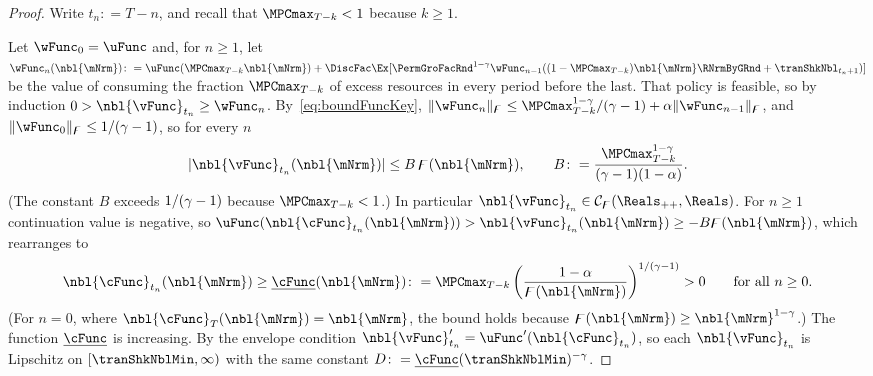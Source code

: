 \documentclass[\econtexRoot/BufferStockTheory]{subfiles}
\begin{document}
\begin{proof}
Write $t_{n}\colon=T-n$, and recall that $\MPCmax_{T-k}<1$ because $k\geq 1$.

Let $\wFunc_{0}=\uFunc$ and, for $n\geq 1$, let $\wFunc_{n}(\nbl{\mNrm})\colon=\uFunc(\MPCmax_{T-k}\nbl{\mNrm})+\DiscFac\Ex[\PermGroFacRnd^{1-\CRRA}\wFunc_{n-1}((1-\MPCmax_{T-k})\nbl{\mNrm}\RNrmByGRnd+\tranShkNbl_{t_{n}+1})]$ be the value of consuming the fraction $\MPCmax_{T-k}$ of excess resources in every period before the last.
That policy is feasible, so by induction $0>\nbl{\vFunc}_{t_{n}}\geq\wFunc_{n}$.
By~\eqref{eq:boundFuncKey}, $\Vert\wFunc_{n}\Vert_{\boundFunc}\leq\MPCmax_{T-k}^{1-\CRRA}/(\CRRA-1)+\Shrinker\Vert\wFunc_{n-1}\Vert_{\boundFunc}$, and $\Vert\wFunc_{0}\Vert_{\boundFunc}\leq 1/(\CRRA-1)$, so for every $n$
\begin{equation}\label{eq:valueBoundUniform}
  \vert\nbl{\vFunc}_{t_{n}}(\nbl{\mNrm})\vert\leq B\,\boundFunc(\nbl{\mNrm}),\qquad B\colon=\frac{\MPCmax_{T-k}^{1-\CRRA}}{(\CRRA-1)(1-\Shrinker)}.
\end{equation}
(The constant $B$ exceeds $1/(\gamma-1)$ because $\MPCmax_{T-k}<1$.)
In particular $\nbl{\vFunc}_{t_{n}}\in\mathcal{C}_{\boundFunc}(\Reals_{++},\Reals)$.
For $n\geq 1$ continuation value is negative, so $\uFunc(\nbl{\cFunc}_{t_{n}}(\nbl{\mNrm}))>\nbl{\vFunc}_{t_{n}}(\nbl{\mNrm})\geq-B\boundFunc(\nbl{\mNrm})$, which rearranges to
\begin{equation}\label{eq:cLowerUniform}
  \nbl{\cFunc}_{t_{n}}(\nbl{\mNrm})\geq\underline{\cFunc}(\nbl{\mNrm})\colon=\MPCmax_{T-k}\left(\frac{1-\Shrinker}{\boundFunc(\nbl{\mNrm})}\right)^{1/(\CRRA-1)}>0\qquad\text{for all $n\geq 0$.}
\end{equation}
(For $n=0$, where $\nbl{\cFunc}_{T}(\nbl{\mNrm})=\nbl{\mNrm}$, the bound holds because $\boundFunc(\nbl{\mNrm})\geq\nbl{\mNrm}^{1-\CRRA}$.)
The function $\underline{\cFunc}$ is increasing.
By the envelope condition $\nbl{\vFunc}_{t_{n}}^{\prime}=\uFunc^{\prime}(\nbl{\cFunc}_{t_{n}})$, so each $\nbl{\vFunc}_{t_{n}}$ is Lipschitz on $[\tranShkNblMin,\infty)$ with the same constant $D\colon=\underline{\cFunc}(\tranShkNblMin)^{-\CRRA}$.


\end{proof}
\end{document}
